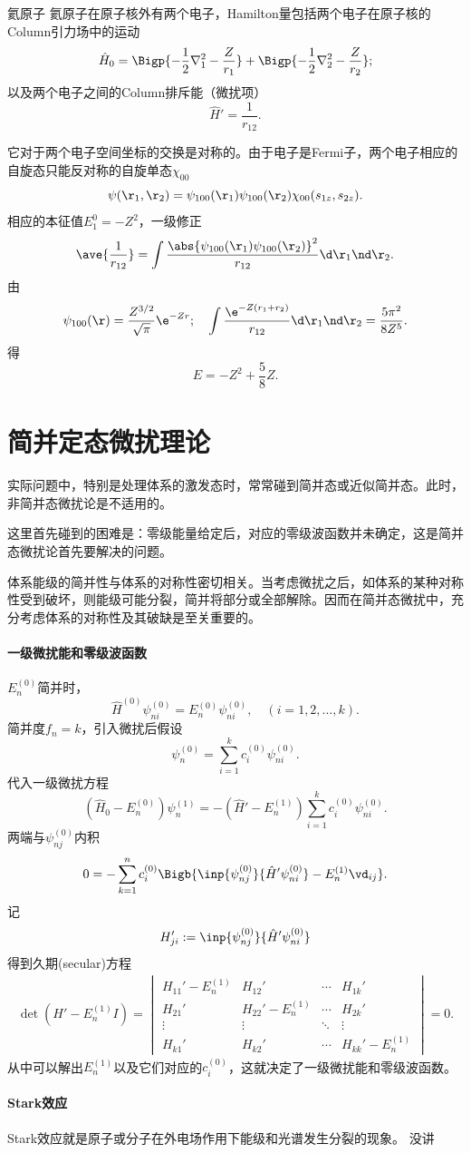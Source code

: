 \begin{example}{氦原子}{}
	氦原子在原子核外有两个电子，Hamilton量包括两个电子在原子核的Column引力场中的运动
	\[
		\hat H_0=\Bigp{-\frac12\nabla_1^2-\frac Z{r_1}}+\Bigp{-\frac12\nabla_2^2-\frac Z{r_2}};
\]
	以及两个电子之间的Column排斥能（微扰项）
	\[
		\hat H'=\frac1{r_{12}}.
\]

	它对于两个电子空间坐标的交换是对称的。由于电子是Fermi子，两个电子相应的自旋态只能反对称的自旋单态$\chi_{00}$
	\[
		\psi(\r_1,\r_2)=\psi_{100}(\r_1)\psi_{100}(\r_2)\chi_{00}(s_{1z},s_{2z}).
\]
	相应的本征值$E_1^0=-Z^2$，一级修正
	\[
		\ave{\frac1{r_{12}}}=\int\frac{\abs{\psi_{100}(\r_1)\psi_{100}(\r_2)}^2}{r_{12}}\d\r_1\nd\r_2.
\]
	由
	\[
		\psi_{100}(\r)=\frac{Z^{3/2}}{\sqrt\pi}\e^{-Zr};\quad \int\frac{\e^{-Z(r_1+r_2)}}{r_{12}}\d\r_1\nd\r_2=\frac{5\pi^2}{8Z^5}.
\]
	得
	\[
E=-Z^2+\frac58Z.
\]
\end{example}
\section{简并定态微扰理论}
实际问题中，特别是处理体系的激发态时，常常碰到简并态或近似简并态。此时，非简并态微扰论是不适用的。

这里首先碰到的困难是：零级能量给定后，对应的零级波函数并未确定，这是简并态微扰论首先要解决的问题。

体系能级的简并性与体系的对称性密切相关。当考虑微扰之后，如体系的某种对称性受到破坏，则能级可能分裂，简并将部分或全部解除。因而在简并态微扰中，充分考虑体系的对称性及其破缺是至关重要的。
\paragraph{一级微扰能和零级波函数}$E_n^{(0)}$简并时，
\[
	\hat H^{(0)}\psi_{ni}^{(0)}=E_n^{(0)}\psi_{ni}^{(0)},\quad (i=1,2,\ldots,k).
\]
简并度$f_n=k$，引入微扰后假设
\[
	\psi_n^{(0)}=\sum_{i=1}^kc_i^{(0)}\psi_{ni}^{(0)}.
\]
代入一级微扰方程
\[
	(\hat H_0-E_n^{(0)})\psi_n^{(1)}=-(\hat H'-E_n^{(1)})\sum_{i=1}^kc_i^{(0)}\psi_{ni}^{(0)}.
\]
两端与$\psi_{nj}^{(0)}$内积
\[
0=-\sum_{k=1}^nc_i^{(0)}\Bigb{\inp{\psi_{nj}^{(0)}}{\hat H'\psi_{ni}^{(0)}}-E_n^{(1)}\vd_{ij}}.
\]
记
\begin{align}
	H_{ji}':=\inp{\psi_{nj}^{(0)}}{\hat H'\psi_{ni}^{(0)}}
\end{align}
得到久期(secular)方程
\begin{align}
	\det(H'-E_n^{(1)}I)=\begin{vmatrix}
		H_{11}'-E_n^{(1)}&H_{12}'&\cdots&H_{1k}'\\
		H_{21}'&H_{22}'-E_n^{(1)}&\cdots&H_{2k}'\\
		\vdots&\vdots&\ddots&\vdots\\
		H_{k1}'&H_{k2}'&\cdots&H_{kk}'-E_n^{(1)}
	\end{vmatrix}=0.
\end{align}
从中可以解出$E_n^{(1)}$以及它们对应的$c_i^{(0)}$，这就决定了一级微扰能和零级波函数。
\paragraph{Stark效应}Stark效应就是原子或分子在外电场作用下能级和光谱发生分裂的现象。
没讲